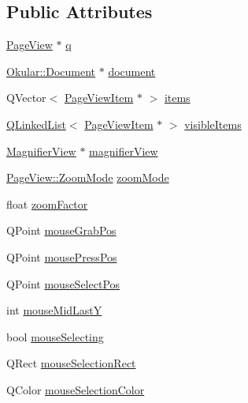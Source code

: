 \subsection*{Public Attributes}
\begin{DoxyCompactItemize}
\item 
\hyperlink{classPageView}{Page\+View} $\ast$ \hyperlink{classPageViewPrivate_a1473b2996b01fd6306734152b4681ba0}{q}
\item 
\hyperlink{classOkular_1_1Document}{Okular\+::\+Document} $\ast$ \hyperlink{classPageViewPrivate_a50645b9853306cffd74e51efb677e5b4}{document}
\item 
Q\+Vector$<$ \hyperlink{classPageViewItem}{Page\+View\+Item} $\ast$ $>$ \hyperlink{classPageViewPrivate_ad90c795dead9abfaa5818a94e00435bc}{items}
\item 
\hyperlink{classQLinkedList}{Q\+Linked\+List}$<$ \hyperlink{classPageViewItem}{Page\+View\+Item} $\ast$ $>$ \hyperlink{classPageViewPrivate_a918fbcda86c5b2b449c97e818ab5d5f9}{visible\+Items}
\item 
\hyperlink{classMagnifierView}{Magnifier\+View} $\ast$ \hyperlink{classPageViewPrivate_aee1dfa250e17ccbf107395f2fe733958}{magnifier\+View}
\item 
\hyperlink{classPageView_af489dc2492677bb4f422660627f62aec}{Page\+View\+::\+Zoom\+Mode} \hyperlink{classPageViewPrivate_a009f59f9f081ced030a81a8ca726c2b2}{zoom\+Mode}
\item 
float \hyperlink{classPageViewPrivate_a938411ef880f839b765aeac48a482b9e}{zoom\+Factor}
\item 
Q\+Point \hyperlink{classPageViewPrivate_aa02b40a75cef0ee7f1b423027a80c8d6}{mouse\+Grab\+Pos}
\item 
Q\+Point \hyperlink{classPageViewPrivate_aa4799ae3aa24957d19a95220d8f61216}{mouse\+Press\+Pos}
\item 
Q\+Point \hyperlink{classPageViewPrivate_aaf8d4b01e8bb0db7ff49544972422a63}{mouse\+Select\+Pos}
\item 
int \hyperlink{classPageViewPrivate_a0962e2c6de7921af1c3e42cae846bd65}{mouse\+Mid\+Last\+Y}
\item 
bool \hyperlink{classPageViewPrivate_a8819b152a8279b75359af2a3e0567681}{mouse\+Selecting}
\item 
Q\+Rect \hyperlink{classPageViewPrivate_a94473cb593838a977bea89214bd1ef66}{mouse\+Selection\+Rect}
\item 
Q\+Color \hyperlink{classPageViewPrivate_ab09ba74cc55e9a99a5e7c0629dde8feb}{mouse\+Selection\+Color}
\item 

\end{DoxyCompactItemize}
